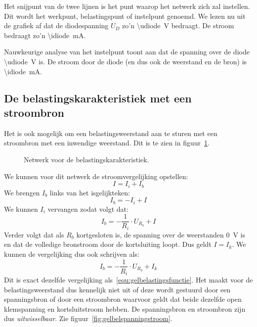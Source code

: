 Het snijpunt van de twee lijnen is het punt waarop het netwerk zich zal instellen. Dit wordt het werkpunt,
belastingspunt of instelpunt genoemd. We lezen nu uit de grafiek af dat de diodespanning $U_D$ zo'n
\SI[round-mode=places,round-precision=1]{\udiode}{\volt} bedraagt. De stroom bedraagt zo'n
\SI[round-mode=places,round-precision=0]{\idiode}{\milli\ampere}.

Nauwkeurige analyse van het instelpunt toont aan dat de spanning over de diode
\SI[round-mode=places,round-precision=2]{\udiode}{\volt} is. De stroom door de diode (en dus ook de
weerstand en de bron) is \SI[round-mode=places,round-precision=2]{\idiode}{\milli\ampere}.

\subsection{De belastingskarakteristiek met een stroombron}
Het is ook mogelijk om een belastingsweerstand aan te sturen met een stroombron met een inwendige weerstand.
Dit is te zien in figuur~\ref{fig:gelschemavoorbelastingskarakteristiekstroombron}.

\begin{figure}[!ht]
\centering
{}
\caption{Netwerk voor de belastingskarakteristiek.}
\label{fig:gelschemavoorbelastingskarakteristiekstroombron}
\end{figure}

We kunnen voor dit netwerk de stroomvergelijking opstellen:
%
\begin{equation}
I = I_i + I_b
\end{equation}
%
We brengen $I_b$ links van het isgelijkteken:
\begin{equation}
I_b = -I_i + I
\end{equation}
%
We kunnen $I_i$ vervangen zodat volgt dat:
%
\begin{equation}
I_b = -\dfrac{1}{R_i}\cdot U_{R_b} + I
\end{equation}
%
Verder volgt dat als $R_b$ kortgesloten is, de spanning over de weerstanden \SI{0}{\volt} is en dat de
volledige bronstroom door de kortsluiting loopt. Dus geldt $I=I_k$. We kunnen de vergelijking
dus ook schrijven als:
%
\begin{equation}
I_b = -\dfrac{1}{R_i}\cdot U_{R_b} + I_k
\end{equation}
%
Dit is exact dezelfde vergelijking als~\eqref{equ:gelbelastingsfunctie}. Het maakt voor de
belastingsweerstand dus kennelijk niet uit of deze wordt gestuurd door een spanningsbron of door een
stroombron waarvoor geldt dat beide dezelfde open klemspanning en kortsluitstroom hebben. De
spanningsbron en stroombron zijn dus \textsl{uitwisselbaar}. Zie figuur~\ref{fig:gelbelspanningstroom}.

